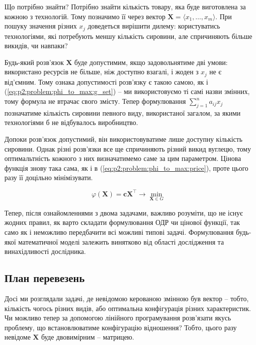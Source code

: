 \documentclass[\main/book.tex]{subfiles}
\begin{document}
Що потрібно знайти? Потрібно знайти кількість товару, яка буде виготовлена за кожною з технологій. Тому позначимо її через вектор $\mathbf{X} = \langle x_1, \ldots, x_m \rangle$. При пошуку значення різних $x_j$ доведеться вирішити дилему: користуватись технологіями, які потребують меншу кількість сировини, але спричиняють більше викидів, чи навпаки?

Будь-який розв'язок $\mathbf{X}$ буде допустимим, якщо задовольнятиме дві умови: використано ресурсів не більше, ніж доступно взагалі, і жоден з $x_j$ не є від'ємним. Тому ознака допустимості розв'язку є такою самою, як і (\ref{eq:p2:problem:phi_to_max:g_set}) -- ми використовуємо ті самі назви змінних, тому формула не втрачає свого змісту. Тепер формулювання ${\sum_{j=1}^n a_{ij} x_j}$ позначатиме кількість сировини певного виду, використаної загалом, за якими технологіями б не відбувалось виробництво.

Допоки розв'язок допустимий, він використовуватиме лише дос\-туп\-ну кількість сировини. Однак різні розв'язки все ще спричиняють різний викид вуглецю, тому оптимальтність кожного з них визначатимемо саме за цим параметром. Цінова функція знову така сама, як і в (\ref{eq:p2:problem:phi_to_max:price}), проте цього разу її доцільно мінімізувати.

\begin{equation}
 \varphi(\mathbf{X}) =
 \mathbf{c} \mathbf{X}^\top
 \rightarrow \min_{\mathbf{X} \in G}
\end{equation}

\begin{note}
Тепер, після ознайомленнями з двома задачами, важливо розуміти, що не існує жодних правил, як варто складати формулювання ОДР чи цінової функції, так само як і неможливо передбачити всі можливі \flqq{}типові задачі\frqq{}. Формулювання будь-якої математичної моделі залежить винятково від області дослідження та винахідливості дослідника.
\end{note}

\subsection{План перевезень}

Досі ми розглядали задачі, де невідомою керованою змінною був вектор -- тобто, кількість чогось різних видів, або оптимальна конфігурація різних характеристик. Чи можливо тепер за допомогою лінійного програмування розв'язати якусь проблему, що встановлюватиме конфігурацію відношення? Тобто, цього разу невідоме $\mathbf{X}$ буде двовимірним -- матрицею.
\end{document}
